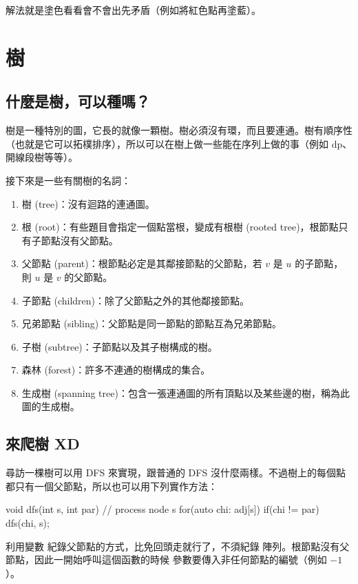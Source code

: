 \documentclass[main.tex]{subfiles}
\begin{document}
解法就是塗色看看會不會出先矛盾（例如將紅色點再塗藍）。


\section{樹}

\subsection{什麼是樹，可以種嗎？}

樹是一種特別的圖，它長的就像一顆樹。樹必須沒有環，而且要連通。樹有順序性（也就是它可以拓樸排序），所以可以在樹上做一些能在序列上做的事（例如 dp、開線段樹等等）。


接下來是一些有關樹的名詞：
\begin{enumerate}
\item 樹 (tree)：沒有迴路的連通圖。
\item 根 (root)：有些題目會指定一個點當根，變成有根樹 (rooted tree)，根節點只有子節點沒有父節點。
\item 父節點 (parent)：根節點必定是其鄰接節點的父節點，若 $v$ 是 $u$ 的子節點，則 $u$ 是 $v$ 的父節點。
\item 子節點 (children)：除了父節點之外的其他鄰接節點。
\item 兄弟節點 (sibling)：父節點是同一節點的節點互為兄弟節點。
\item 子樹 (subtree)：子節點以及其子樹構成的樹。
\item 森林 (forest)：許多不連通的樹構成的集合。
\item 生成樹 (spanning tree)：包含一張連通圖的所有頂點以及某些邊的樹，稱為此圖的生成樹。
\end{enumerate}

\subsection{來爬樹 XD}
尋訪一棵樹可以用 DFS 來實現，跟普通的 DFS 沒什麼兩樣。不過樹上的每個點都只有一個父節點，所以也可以用下列實作方法：
\begin{C++}
void dfs(int s, int par){
	// process node s
	for(auto chi: adj[s]){
		if(chi != par)	 dfs(chi, s);
	}
}
\end{C++}
利用變數  紀錄父節點的方式，比免回頭走就行了，不須紀錄  陣列。根節點沒有父節點，因此一開始呼叫這個函數的時候  參數要傳入非任何節點的編號（例如 $-1$）。
\end{document}

